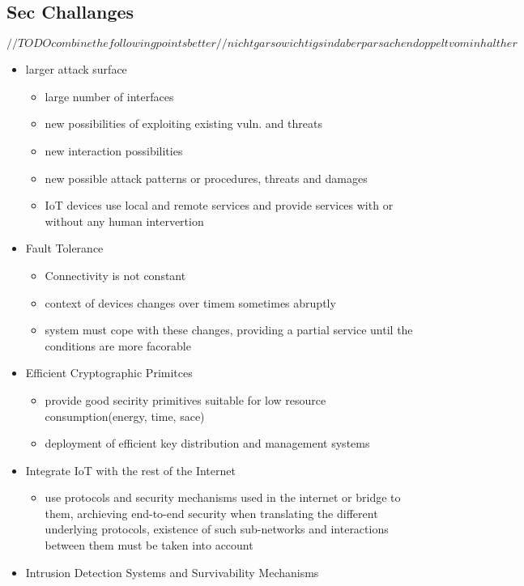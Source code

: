 \documentclass[a4paper, 12pt]{article}
\begin{document}
\subsection{Sec Challanges}
$ //TODO combine the following points better // nicht gar so wichtig sind aber par sachen doppelt vom inhalt her$
\begin{itemize}
\item larger attack surface
\begin{itemize}
\item large number of interfaces
\item new possibilities of exploiting existing vuln. and threats
\item new interaction possibilities
\item new possible attack patterns or procedures, threats and damages
\item IoT devices use local and remote services and provide services with or without any human intervertion
\end{itemize}
\item Fault Tolerance
\begin{itemize}
\item Connectivity is not constant
\item context of devices changes over timem sometimes abruptly
\item system must cope with these changes, providing a partial service until the conditions are more facorable
\end{itemize}
\item Efficient Cryptographic Primitces
\begin{itemize}
\item provide good secirity primitives suitable for low resource consumption(energy, time, sace)
\item deployment of efficient key distribution and management systems
\end{itemize}
\item Integrate IoT with the rest of the Internet
\begin{itemize}
\item use protocols and security mechanisms used in the internet or bridge to them, archieving end-to-end security when translating the different underlying protocols, existence of such sub-networks and interactions between them must be taken into account
\end{itemize}
\item Intrusion Detection Systems and Survivability Mechanisms
\begin{itemize}

\end{itemize}
\end{itemize}
\end{document}
